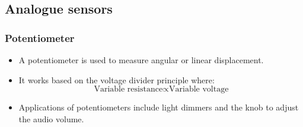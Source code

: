 \documentclass[11pt]{article}
\begin{document}
 \newpage
\subsection{Analogue sensors}
\label{sec:org876c3a4}

\subsubsection{Potentiometer}
\label{sec:orgd2a107d}
\begin{itemize}
\item A potentiometer is used to measure angular or linear displacement.
\item It works based on the voltage divider principle where:
\[\text{Variable resistance} \propto \text{Variable voltage}\]
\item Applications of potentiometers include light dimmers and the knob to adjust the audio volume.
\end{itemize}
\end{document}

